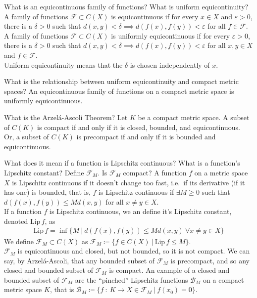 \documentclass[avery5388,grid,frame]{flashcards}
\newcommand{\E}{\varepsilon}
\newcommand{\Lip}{\mathrm{Lip}\,}
\newcommand{\f}[3]{#1\ :\ #2 \rightarrow #3}
\begin{document}
\begin{flashcard}
    {What is an equicontinuous family of functions?  What is uniform equicontinuity?}
    A family of functions $\mathcal{F} \subset C(X)$ is equicontinuous if for every $x \in X$ and $\E > 0$, there is a $\delta > 0$ such that $d(x,y) < \delta \implies d(f(x),f(y)) < \E$ for all $f \in \mathcal{F}$. \\

    A family of functions $\mathcal{F} \subset C(X)$ is uniformly equicontinuous if for every $\E > 0$, there is a $\delta > 0$ such that $d(x,y) < \delta \implies d(f(x),f(y)) < \E$ for all $x,y \in X$ and $f \in \mathcal{F}$. \\

    Uniform equicontinuity means that the $\delta$ is chosen independently of $x$.
\end{flashcard}

\begin{flashcard}
    {What is the relationship between uniform equicontinuity and compact metric spaces?}
    An equicontinuous family of functions on a compact metric space is uniformly equicontinuous.
\end{flashcard}

\begin{flashcard}
    {What is the Arzel\'{a}-Ascoli Theorem?}
    Let $K$ be a compact metric space.  A subset of $C(K)$ is compact if and only if it is closed, bounded, and equicontinuous. \\

    Or, a subset of $C(K)$ is precompact if and only if it is bounded and equicontinuous.
\end{flashcard}

\begin{flashcard}
    {What does it mean if a function is Lipschitz continuous?  What is a function's Lipschitz constant?  Define $\mathcal{F}_M$.  Is $\mathcal{F}_M$ compact?}
    A function $f$ on a metric space $X$ is Lipschitz continuous if it doesn't change too fast, i.e.~if its derivative (if it has one) is bounded, that is, $f$ is Lipschitz continuous if $\exists M \geq 0$ such that $d(f(x), f(y)) \leq Md(x,y)$ for all $x \neq y \in X$. \\

    If a function $f$ is Lipschitz continuous, we an define it's Lipschitz constant, denoted $\Lip f$, as
    \begin{align*}
        \Lip f = \inf \{M\ |\ d(f(x),f(y)) \leq Md(x,y)\ \forall x \neq y \in X\}
    \end{align*}
    We define $\mathcal{F}_M \subset C(X)$ as $\mathcal{F}_M \coloneqq \{f \in C(X)\ |\ \Lip f \leq M\}$. \\

    $\mathcal{F}_M$ is equicontinuous and closed, but not bounded, so it is not compact.  We can say, by Arzel\'{a}-Ascoli, that any bounded subset of $\mathcal{F}_M$ is precompact, and so any closed and bounded subset of $\mathcal{F}_M$ is compact.  An example of a closed and bounded subset of $\mathcal{F}_M$ are the ``pinched'' Lipschitz functions $\mathcal{B}_M$ on a compact metric space $K$, that is $\mathcal{B}_M \coloneqq \{\f{f}{K}{X} \in \mathcal{F}_M\ |\ f(x_0) = 0\}$.
\end{flashcard}
\end{document}
